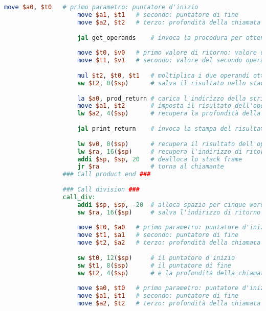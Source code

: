 \begin{center}
\begin{lstlisting}[language=mips, gobble=14, stepnumber=1]
                    move $a0, $t0   # primo parametro: puntatore d'inizio
                    move $a1, $t1   # secondo: puntatore di fine
                    move $a2, $t2   # terzo: profondità della chiamata
                    
                    jal get_operands    # invoca la procedura per ottenere gli operandi
                    
                    move $t0, $v0   # primo valore di ritorno: valore del primo operando
                    move $t1, $v1   # secondo: valore del secondo operando
                    
                    mul $t2, $t0, $t1   # moltiplica i due operandi ottenuti
                    sw $t2, 0($sp)      # salva il risultato nello stack
                    
                    la $a0, prod_return # carica l'indirizzo della stringa prod_return (primo parametro)
                    move $a1, $t2       # imposta il risultato dell'operazione come secondo parametro
                    lw $a2, 4($sp)      # recupera la profondità della chiamata (terzo parametro)
                    
                    jal print_return    # invoca la stampa del risultato con questi tre parametri
                    
                    lw $v0, 0($sp)      # recupera il risultato dell'operazione
                    lw $ra, 16($sp)     # recupera l'indirizzo di ritorno
                    addi $sp, $sp, 20   # dealloca lo stack frame
                    jr $ra              # torna al chiamante
                ### Call product end ###
                
                ### Call division ###
                call_div:
                    addi $sp, $sp, -20  # alloca spazio per cinque words nello stack frame
                    sw $ra, 16($sp)     # salva l'indirizzo di ritorno nello stack
                    
                    move $t0, $a0   # primo parametro: puntatore d'inizio
                    move $t1, $a1   # secondo: puntatore di fine
                    move $t2, $a2   # terzo: profondità della chiamata
                    
                    sw $t0, 12($sp)     # il puntatore d'inizio
                    sw $t1, 8($sp)      # il puntatore di fine
                    sw $t2, 4($sp)      # e la profondità della chiamata
                    
                    move $a0, $t0   # primo parametro: puntatore d'inizio
                    move $a1, $t1   # secondo: puntatore di fine
                    move $a2, $t2   # terzo: profondità della chiamata
                    

\end{lstlisting}
\end{center}
